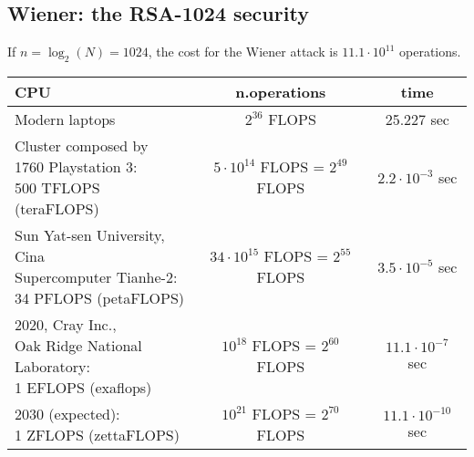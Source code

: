 \documentclass[a4paper, 10pt, titlepage]{article}
\begin{document}
\subsection{Wiener: the RSA-1024 security}
If $n = \log_2(N) = 1024$, the cost for the Wiener attack is $11.1 \cdot 10^{11}$ operations. \medskip \\
\begin{tabular}{|l|c|c|} \hline
\textbf{CPU} & \textbf{n.operations} & \textbf{time} \\ \hline
Modern laptops & $2^{36}$ FLOPS  & 25.227 sec \\ \hline
\makecell{Cluster composed by \\
1760 Playstation 3: \\
500 TFLOPS (teraFLOPS)} 
& $5 \cdot 10^{14}$ FLOPS = $2^{49}$ FLOPS & $2.2 \cdot 10^{-3}$ sec \\ \hline
\makecell{Sun Yat-sen University, Cina \\
Supercomputer Tianhe-2:\\
34 PFLOPS (petaFLOPS)}
& $34 \cdot 10^{15}$ FLOPS = $2^{55}$ FLOPS & $3.5 \cdot 10^{-5}$ sec \\ \hline
\makecell{2020, Cray Inc., \\
Oak Ridge National Laboratory: \\
1 EFLOPS (exaflops)} 
& $10^{18}$ FLOPS = $2^{60}$ FLOPS & $11.1 \cdot 10^{-7}$ sec \\ \hline
\makecell{
2030 (expected): \\
1 ZFLOPS (zettaFLOPS)}
& $10^{21}$ FLOPS = $2^{70}$ FLOPS & $11.1 \cdot 10^{-10}$ sec \\ \hline
\end{tabular}
\end{document}
